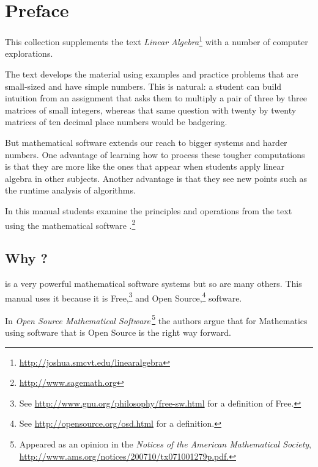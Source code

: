 \chapter*{Preface}\pagestyle{preface}\thispagestyle{preface}


This collection supplements the text
\textit{Linear Algebra}\footnote{\protect\url{http://joshua.smcvt.edu/linearalgebra}}
with a number of computer explorations.

The text develops the material using examples and practice problems
that are small-sized and have simple numbers.
This is natural: a student can build intuition from an assignment 
that asks them to multiply a pair of 
three by three matrices of small integers, whereas that same 
question with twenty by twenty matrices
of ten decimal place numbers would be badgering. 

But mathematical software extends our reach to bigger systems and
harder numbers.
One advantage of learning how to process these tougher computations is that 
they are more like the ones that appear when students apply linear 
algebra in other subjects.
Another advantage is that they see new points such as 
the runtime analysis of algorithms.

In this manual students examine the principles and operations 
from the text using 
the mathematical software \sage{}.\footnote{\url{http://www.sagemath.org}}


\section{Why \sage?}
\sage{} is a very powerful mathematical software systems but so are
many others.
This manual uses it because it is 
Free,\footnote{See \protect\url{http://www.gnu.org/philosophy/free-sw.html} for a definition of Free.} 
and Open Source,\footnote{See \protect\url{http://opensource.org/osd.html} for a definition.} software.

In 
\textit{Open Source Mathematical Software\,}\footnote{Appeared as an opinion in the \protect\textit{Notices of the American Mathematical Society}, \protect\url{http://www.ams.org/notices/200710/tx071001279p.pdf.}}
the authors argue that for Mathematics using software that is Open Source
is the right way forward.

